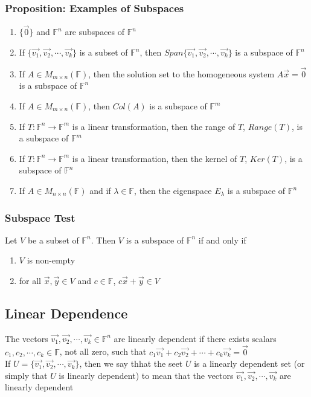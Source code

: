 \documentclass[12pt, letterpaper]{article}
\begin{document}
\subsubsection{Proposition: Examples of Subspaces}
\begin{enumerate}
    \item $\{\vec{0}\}$ and $\mathbb{F}^n$ are subspaces of $\mathbb{F}^n$
    \item If $\{\vec{v_1}, \vec{v_2}, \cdots, \vec{v_k}\}$ is a subset of $\mathbb{F}^n$, then $Span\{\vec{v_1}, \vec{v_2}, \cdots, \vec{v_k}\}$ is a subspace of $\mathbb{F}^n$
    \item If $A\in M_{m\times n}(\mathbb{F})$, then the solution set to the homogeneous system $A\vec{x}=\vec{0}$ is a subspace of $\mathbb{F}^n$
    \item If $A\in M_{m\times n}(\mathbb{F})$, then $Col(A)$ is a subspace of $\mathbb{F}^m$
    \item If $T:\mathbb{F}^n\rightarrow\mathbb{F}^m$ is a linear transformation, then the range of $T$, $Range(T)$, is a subspace of $\mathbb{F}^m$
    \item If $T:\mathbb{F}^n\rightarrow\mathbb{F}^m$ is a linear transformation, then the kernel of $T$, $Ker(T)$, is a subspace of $\mathbb{F}^n$
    \item If $A\in M_{n\times n}(\mathbb{F})$ and if $\lambda\in\mathbb{F}$, then the eigenspace $E_\lambda$ is a subspace of $\mathbb{F}^n$
\end{enumerate}
\subsubsection{Subspace Test}
Let $V$ be a subset of $\mathbb{F}^n$. Then $V$ is a subspace of $\mathbb{F}^n$ if and only if 
\begin{enumerate}
    \item $V$ is non-empty 
    \item for all $\vec{x},\vec{y}\in V$ and $c\in\mathbb{F}$, $c\vec{x}+\vec{y}\in V$
\end{enumerate}
\subsection{Linear Dependence}
The vectors $\vec{v_1}, \vec{v_2}, \cdots, \vec{v_k}\in\mathbb{F}^n$ are linearly dependent if there exists scalars $c_1, c_2, \cdots, c_k\in\mathbb{F}$, not all zero, such that 
$c_1\vec{v_1}+c_2\vec{v_2}+\cdots+c_k\vec{v_k} = \vec{0}$\\
If $U=\{\vec{v_1}, \vec{v_2}, \cdots, \vec{v_k}\}$, then we say thhat the seet $U$ is a linearly dependent set (or simply that $U$ is linearly dependent) to mean that the vectors  
$\vec{v_1}, \vec{v_2}, \cdots, \vec{v_k}$ are linearly dependent
\end{document}
